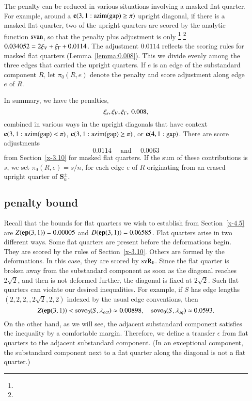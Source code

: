 The penalty can be reduced in various situations involving a
masked flat quarter.  For example, around a ${\operatorname{\bf c}}{(3,1: {\operatorname{azim}}({\operatorname{gap}}) \ge \pi)}$ upright
diagonal, if there is a masked flat quarter, two of the upright
quarters are scored by the analytic  function ${\operatorname{svan}}$, so that the
penalty plus adjustment is only%
\footnote{} %
\footnote{} %
 $0.034052=2\xi_V+\xi_\Gamma+0.0114$.
The adjustment $0.0114$ reflects the scoring
rules for masked flat quarters (Lemma~\ref{lemma:0.008}).  This we
divide evenly among the three edges that carried the upright
quarters. If $e$ is an edge of the substandard component $R$, let $\pi_0(R,e)$
denote the penalty and score adjustment along edge $e$ of $R$.

In summary, we have the penalties,
    $$\xi_\kappa,\xi_V,\xi_\Gamma,\ 0.008,$$
combined in various ways in the upright diagonals that have context
${\operatorname{\bf c}}{(3,1: {\operatorname{azim}}({\operatorname{gap}}) <\pi)}$, ${\operatorname{\bf c}}{(3,1: {\operatorname{azim}}({\operatorname{gap}}) \ge \pi)}$, or ${\operatorname{\bf c}}{(4,1:{\operatorname{gap}})}$.  There are score
adjustments
    $$0.0114\quad \text{ and }\quad 0.0063$$
from Section~\ref{x-3.10} for masked flat quarters.  If the sum of these
contributions is $s$, we set $\pi_0(R,e)=s/n$, for each edge $e$ of $R$
originating from an erased upright quarter of
    $\mathcal{\mathbf S}_n^\pm$.

\subsection{penalty bound} %

Recall that the bounds for flat quarters we wish to establish from
Section~\ref{x-4.5} are $Z({\operatorname{\bf ep}}{(3,1)})=0.00005$ and $D({\operatorname{\bf ep}}{(3,1)})=0.06585$. Flat
quarters arise in two different ways.  Some flat quarters are present
before the deformations begin.  They are scored by the rules of
Section~\ref{x-3.10}. Others are formed by the deformations.  In this
case, they are scored by ${\operatorname{svR}}_0$. Since the flat quarter is broken away
from the substandard component as soon as the diagonal reaches $2\sqrt{2}$, and then
is not deformed further, the diagonal is fixed at $2\sqrt{2}$.  Such
flat quarters can violate our desired inequalities. For example,
if $S$ has edge lengths $(2,2,2,,2\sqrt{2},2,2)$ indexed by the usual
edge conventions, then
    $$
    Z({\operatorname{\bf ep}}{(3,1)})<{\operatorname{sovo}}_0(S,\lambda_{oct}) 
      \approx 0.00898,\quad
        {\operatorname{sovo}}_0(S,\lambda_{sq})\approx 0.0593.
    $$
On the other hand, as we will see, the adjacent substandard component satisfies the
inequality by a comfortable margin.  Therefore, we define a transfer
$\epsilon$ from flat quarters to the adjacent substandard component. (In an
exceptional component, the substandard component next to a flat quarter along the
diagonal is not a flat quarter.)

